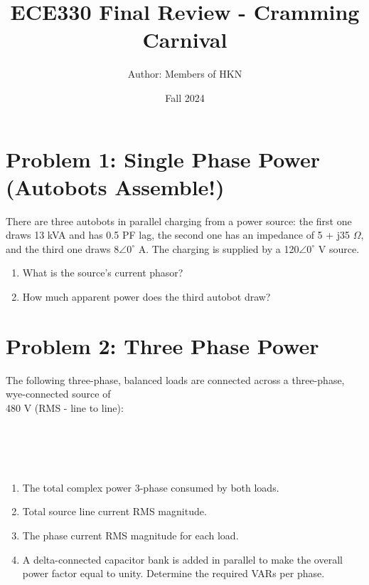 \documentclass{article}
\title{ECE330 Final Review - Cramming Carnival}
\author{Author: Members of HKN}
\date{Fall 2024}
\begin{document}
\maketitle


\noindent
\section*{Problem 1: Single Phase Power (Autobots Assemble!)} %
There are three autobots in parallel charging from a power source: the first one draws 13 kVA and has 0.5 PF lag, the second one has an impedance of 5 + j35 $\Omega$, and the third one draws 8$\angle 0^{\circ}$ A. The charging is supplied by a 120$\angle 0^{\circ}$ V source.
\begin{enumerate}[label=(\alph*)]
    \item {What is the source's current phasor?}
    \item {How much apparent power does the third autobot draw?}
\end{enumerate}

\newpage %
\noindent
\section*{Problem 2: Three Phase Power}
The following three-phase, balanced loads are connected across a three-phase, wye-connected source of \\ 480 V (RMS - line to line):   \\ \\ 
 \\
\\ \\ 
\begin{enumerate}[label=(\alph*)]
    \item {The total complex power 3-phase consumed by both loads. }
    \item {Total source line current RMS magnitude.}
    \item {The phase current RMS magnitude for each load.}
    \item {A delta-connected capacitor bank is added in parallel to make the overall power factor equal to unity. Determine the required VARs per phase.}
\end{enumerate}

\newpage %
\noindent 
\end{document}
